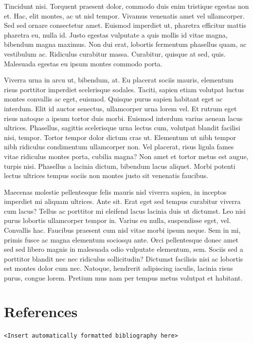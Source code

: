 \documentclass[11pt,]{report}
\begin{document}
Tincidunt nisi. Torquent praesent dolor, commodo duis enim tristique
egestas non et. Hac, elit montes, ac ut nisl tempor. Vivamus venenatis
amet vel ullamcorper. Sed sed ornare consectetur amet. Euismod imperdiet
ut, pharetra efficitur mattis pharetra eu, nulla id. Justo egestas
vulputate a quis mollis id vitae magna, bibendum magna maximus. Non dui
erat, lobortis fermentum phasellus quam, ac vestibulum ac. Ridiculus
curabitur massa. Curabitur, quisque at sed, quis. Malesuada egestas eu
ipsum montes commodo porta.

Viverra urna in arcu ut, bibendum, at. Eu placerat sociis mauris,
elementum risus porttitor imperdiet scelerisque sodales. Taciti, sapien
etiam volutpat luctus montes convallis ac eget, euismod. Quisque purus
sapien habitant eget ac interdum. Elit id auctor senectus, ullamcorper
urna lorem vel. Et rutrum eget risus natoque a ipsum tortor duis morbi.
Euismod interdum varius aenean lacus ultrices. Phasellus, sagittis
scelerisque urna lectus cum, volutpat blandit facilisi nisi, tempor.
Tortor tempor dolor dictum cras ut. Elementum ut nibh tempor nibh
ridiculus condimentum ullamcorper non. Vel placerat, risus ligula fames
vitae ridiculus montes porta, cubilia magna? Non amet et tortor metus
est augue, turpis nisi. Phasellus a lacinia dictum, bibendum lacus
aliquet. Morbi potenti lectus ultrices tempus sociis non montes justo
sit venenatis faucibus.

Maecenas molestie pellentesque felis mauris nisl viverra sapien, in
inceptos imperdiet mi aliquam ultrices. Ante sit. Erat eget sed tempus
curabitur viverra cum lacus? Tellus ac porttitor mi eleifend lacus
lacinia duis ut dictumst. Leo nisi purus lobortis ullamcorper tempor in.
Varius eu nulla, suspendisse eget, vel. Convallis hac. Faucibus praesent
cum nisl vitae morbi ipsum neque. Sem in mi, primis fusce ac magna
elementum sociosqu ante. Orci pellentesque donec amet sed sed libero
magnis in malesuada odio vulputate elementum, sem. Sociis sed a
porttitor blandit nec nec ridiculus sollicitudin? Dictumst facilisis
nisi ac lobortis est montes dolor cum nec. Natoque, hendrerit adipiscing
iaculis, lacinia risus purus, congue lorem. Pretium mus nam per tempus
metus volutpat et habitant.

\hypertarget{references}{%
\chapter{References}\label{references}}

\texttt{\textless{}Insert\ automatically\ formatted\ bibliography\ here\textgreater{}}
\end{document}
